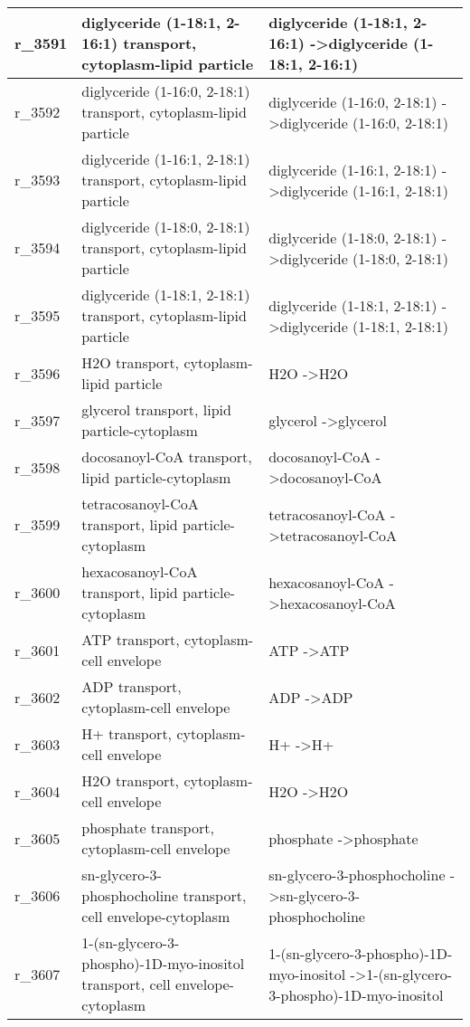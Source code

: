 \begin{landscape}
{\begin{longtable}{|l|p{7cm}|p{15cm}|}
r\_3591 & diglyceride (1-18:1, 2-16:1) transport, cytoplasm-lipid particle & diglyceride (1-18:1, 2-16:1)  -\textgreater diglyceride (1-18:1, 2-16:1) \\ \hline
r\_3592 & diglyceride (1-16:0, 2-18:1) transport, cytoplasm-lipid particle & diglyceride (1-16:0, 2-18:1)  -\textgreater diglyceride (1-16:0, 2-18:1) \\ \hline
r\_3593 & diglyceride (1-16:1, 2-18:1) transport, cytoplasm-lipid particle & diglyceride (1-16:1, 2-18:1)  -\textgreater diglyceride (1-16:1, 2-18:1) \\ \hline
r\_3594 & diglyceride (1-18:0, 2-18:1) transport, cytoplasm-lipid particle & diglyceride (1-18:0, 2-18:1)  -\textgreater diglyceride (1-18:0, 2-18:1) \\ \hline
r\_3595 & diglyceride (1-18:1, 2-18:1) transport, cytoplasm-lipid particle & diglyceride (1-18:1, 2-18:1)  -\textgreater diglyceride (1-18:1, 2-18:1) \\ \hline
r\_3596 & H2O transport, cytoplasm-lipid particle & H2O  -\textgreater H2O \\ \hline
r\_3597 & glycerol transport, lipid particle-cytoplasm & glycerol  -\textgreater glycerol \\ \hline
r\_3598 & docosanoyl-CoA transport, lipid particle-cytoplasm & docosanoyl-CoA  -\textgreater docosanoyl-CoA \\ \hline
r\_3599 & tetracosanoyl-CoA transport, lipid particle-cytoplasm & tetracosanoyl-CoA  -\textgreater tetracosanoyl-CoA \\ \hline
r\_3600 & hexacosanoyl-CoA transport, lipid particle-cytoplasm & hexacosanoyl-CoA  -\textgreater hexacosanoyl-CoA \\ \hline
r\_3601 & ATP transport, cytoplasm-cell envelope & ATP  -\textgreater ATP \\ \hline
r\_3602 & ADP transport, cytoplasm-cell envelope & ADP  -\textgreater ADP \\ \hline
r\_3603 & H+ transport, cytoplasm-cell envelope & H+  -\textgreater H+ \\ \hline
r\_3604 & H2O transport, cytoplasm-cell envelope & H2O  -\textgreater H2O \\ \hline
r\_3605 & phosphate transport, cytoplasm-cell envelope & phosphate  -\textgreater phosphate \\ \hline
r\_3606 & sn-glycero-3-phosphocholine transport, cell envelope-cytoplasm & sn-glycero-3-phosphocholine  -\textgreater sn-glycero-3-phosphocholine \\ \hline
r\_3607 & 1-(sn-glycero-3-phospho)-1D-myo-inositol transport, cell envelope-cytoplasm & 1-(sn-glycero-3-phospho)-1D-myo-inositol  -\textgreater 1-(sn-glycero-3-phospho)-1D-myo-inositol \\ \hline

\end{longtable}}
\end{landscape}

